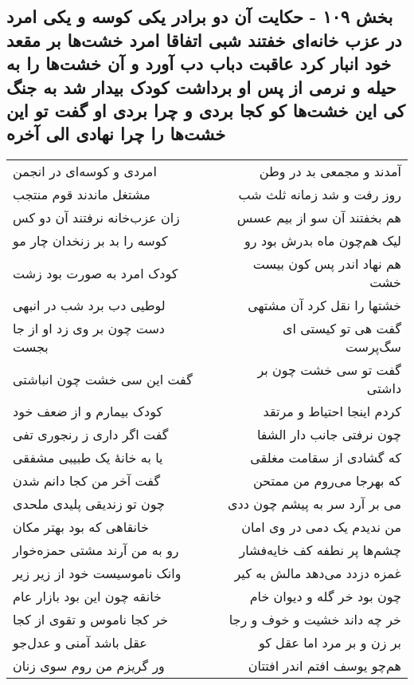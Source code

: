 \begin{center}
\section*{بخش ۱۰۹ - حکایت آن دو برادر یکی کوسه و یکی امرد در عزب خانه‌ای خفتند شبی اتفاقا امرد خشت‌ها بر مقعد خود انبار کرد عاقبت دباب دب آورد و آن خشت‌ها را به حیله و نرمی از پس او برداشت کودک بیدار شد به جنگ کی این خشت‌ها کو کجا بردی و چرا بردی او گفت تو این خشت‌ها را چرا نهادی الی آخره}
\label{sec:sh109}
\begin{longtable}{l p{0.5cm} r}
امردی و کوسه‌ای در انجمن
&&
آمدند و مجمعی بد در وطن
\\
مشتغل ماندند قوم منتجب
&&
روز رفت و شد زمانه ثلث شب
\\
زان عزب‌خانه نرفتند آن دو کس
&&
هم بخفتند آن سو از بیم عسس
\\
کوسه را بد بر زنخدان چار مو
&&
لیک هم‌چون ماه بدرش بود رو
\\
کودک امرد به صورت بود زشت
&&
هم نهاد اندر پس کون بیست خشت
\\
لوطیی دب برد شب در انبهی
&&
خشتها را نقل کرد آن مشتهی
\\
دست چون بر وی زد او از جا بجست
&&
گفت هی تو کیستی ای سگ‌پرست
\\
گفت این سی خشت چون انباشتی
&&
گفت تو سی خشت چون بر داشتی
\\
کودک بیمارم و از ضعف خود
&&
کردم اینجا احتیاط و مرتقد
\\
گفت اگر داری ز رنجوری تفی
&&
چون نرفتی جانب دار الشفا
\\
یا به خانهٔ یک طبیبی مشفقی
&&
که گشادی از سقامت مغلقی
\\
گفت آخر من کجا دانم شدن
&&
که بهرجا می‌روم من ممتحن
\\
چون تو زندیقی پلیدی ملحدی
&&
می بر آرد سر به پیشم چون ددی
\\
خانقاهی که بود بهتر مکان
&&
من ندیدم یک دمی در وی امان
\\
رو به من آرند مشتی حمزه‌خوار
&&
چشم‌ها پر نطفه کف خایه‌فشار
\\
وانک ناموسیست خود از زیر زیر
&&
غمزه دزدد می‌دهد مالش به کیر
\\
خانقه چون این بود بازار عام
&&
چون بود خر گله و دیوان خام
\\
خر کجا ناموس و تقوی از کجا
&&
خر چه داند خشیت و خوف و رجا
\\
عقل باشد آمنی و عدل‌جو
&&
بر زن و بر مرد اما عقل کو
\\
ور گریزم من روم سوی زنان
&&
هم‌چو یوسف افتم اندر افتتان
\\

\end{longtable}
\end{center}
